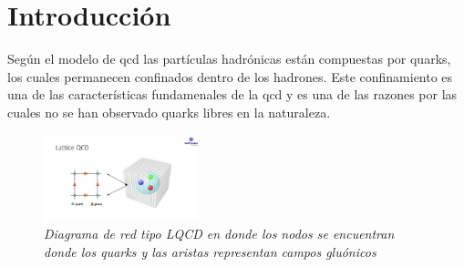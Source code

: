 \chapter*{Introducción}

\pagestyle{fancy}
\fancyhf{} %

% 

Según el modelo de \acrfull{qcd} las partículas hadrónicas están compuestas por quarks, los cuales permanecen confinados dentro de los hadrones. Este confinamiento es una de las características fundamenales de la \acrshort{qcd} y es una de las razones por las cuales no se han observado quarks libres en la naturaleza.

\renewcommand{\figurename}{Fig.}

\begin{figure}
\centering
\includegraphics[width=0.4\textwidth]{./Images/LQCD.jpg}
\caption[Red LQCD]{\emph{Diagrama de red tipo LQCD en donde los nodos se encuentran donde los quarks y las aristas representan campos gluónicos}}
\label{fig: LQCD}
\end{figure}

